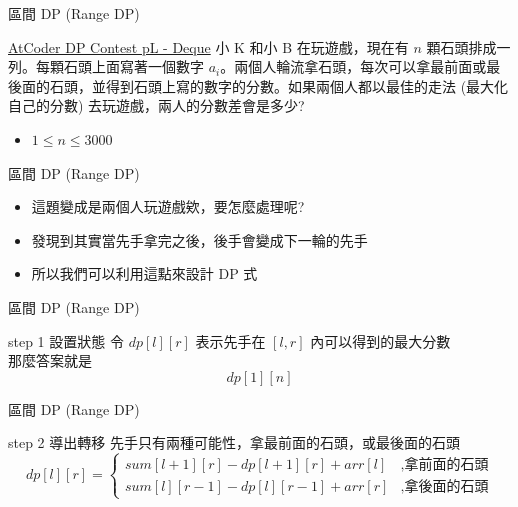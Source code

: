 \documentclass[aspectratio=169]{beamer}
\begin{document}
    \begin{frame}{區間 DP (Range DP)}
        \begin{block}{\href{https://atcoder.jp/contests/dp/tasks/dp_l}{AtCoder DP Contest pL - Deque}}
            小 K 和小 B 在玩遊戲，現在有 $n$ 顆石頭排成一列。每顆石頭上面寫著一個數字 $a_i$。兩個人輪流拿石頭，每次可以拿最前面或最後面的石頭，並得到石頭上寫的數字的分數。如果兩個人都以最佳的走法 (最大化自己的分數) 去玩遊戲，兩人的分數差會是多少?
            \begin{itemize}
                \item $1 \le n \le 3000$
            \end{itemize}
        \end{block}
    \end{frame}
    
     \begin{frame}{區間 DP (Range DP)}
        \begin{itemize}
            \item 這題變成是兩個人玩遊戲欸，要怎麼處理呢?
            \item<2-> 發現到其實當先手拿完之後，後手會變成下一輪的先手
            \item<2-> 所以我們可以利用這點來設計 DP 式
        \end{itemize}
    \end{frame}
    
    \begin{frame}{區間 DP (Range DP)}
        \begin{alertblock}{step 1 設置狀態}
            令 $dp[l][r]$ 表示先手在 $[l,r]$ 內可以得到的最大分數  \\
            \vspace{2.5mm}
            那麼答案就是 $$dp[1][n]$$
        \end{alertblock}
    \end{frame}
    
    \begin{frame}{區間 DP (Range DP)}
        \begin{block}{step 2 導出轉移}
            先手只有兩種可能性，拿最前面的石頭，或最後面的石頭
            $$dp[l][r] = \begin{cases} sum[l+1][r] - dp[l+1][r] + arr[l] &, \text{拿前面的石頭}\\ sum[l][r-1] - dp[l][r-1] + arr[r] &, \text{拿後面的石頭} \end{cases}$$
        \end{block}
    \end{frame}
    
\end{document}
